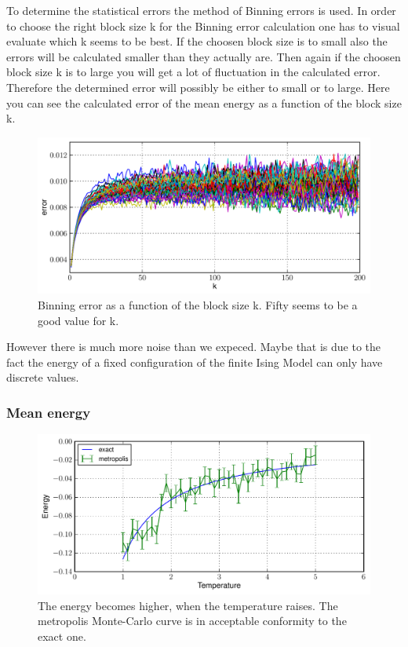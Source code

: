 \documentclass[12pt,a4paper]{scrartcl}
\begin{document}
To determine the statistical errors the method of Binning errors is used. In order to choose the right block size k for the Binning error calculation one has to visual evaluate which k seems to be best. If the choosen block size is to small also the errors will be calculated smaller than they actually are. Then again if the choosen block size k is to large you will get a lot of fluctuation in the calculated error. Therefore the determined error will possibly be either to small or to large. Here you can see the calculated error of the mean energy as a function of the block size k.

\begin{figure}[H]
\includegraphics[width=14.0cm]{../plots/Binning_error.pdf}
\caption{Binning error as a function of the block size k. Fifty seems to be a good value for k.}
\end{figure}

However there is much more noise than we expeced. Maybe that is due to the fact the energy of a fixed configuration of the finite Ising Model can only have discrete values.

\subsubsection{Mean energy}
\begin{figure}[H]
\includegraphics[width=14.0cm]{../plots/Mean_energy.pdf}
\caption{The energy becomes higher, when the temperature raises. The metropolis Monte-Carlo curve is in acceptable conformity to the exact one.}
\end{figure}
\end{document}
